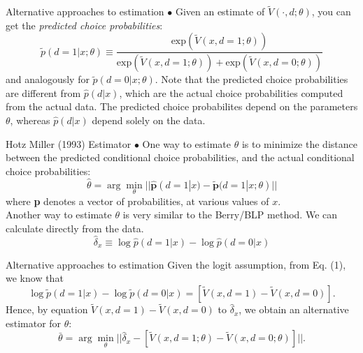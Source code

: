 \begin{frame}{Alternative approaches to estimation}
$\bullet$ Given an estimate of $\tilde V (\cdot, d; \theta)$, you can get the \emph{predicted choice probabilities}: 
\begin{equation}
\tilde p (d =1 |x ; \theta) \equiv \frac {\text{exp} \left ( \tilde V (x, d=1; \theta) \right )}{\text{exp} \left ( \tilde V (x, d=1 ;\theta) \right ) + \text{exp} \left ( \tilde V (x, d= 0 ;\theta ) \right )}
\end{equation}
and analogously for $\tilde p (d = 0 |x ; \theta)$. Note that the predicted choice probabilities are different from $\hat p (d|x)$, which are the actual choice probabilities computed from the actual data. The predicted choice probabilites depend on the parameters $\theta$, whereas $\hat p (d|x)$ depend solely on the data. 
\end{frame}

\begin{frame}{Hotz Miller (1993) Estimator}
$\bullet$ One way to estimate $\theta$ is to minimize the distance between the predicted conditional choice probabilities, and the actual conditional choice probabilities:
\begin{equation*}
\hat \theta = \arg \min_\theta || \hat {\symbf{p}} (d = 1 |x) - \tilde {\symbf{p}} (d = 1 |x; \theta) ||
\end{equation*}
where \textbf{p} denotes a vector of probabilities, at various values of $x$. \\
Another way to estimate $\theta$ is very similar to the Berry/BLP method. We can calculate directly from the data. 
\begin{equation*}
\hat \delta_x \equiv \log \hat p ( d =1 |x) - \log \hat p (d = 0 |x)
\end{equation*}
\end{frame}

\begin{frame}{Alternative approaches to estimation}
Given the logit assumption, from Eq. (1), we know that
\begin{equation*}
\log \tilde p (d=1 |x) - \log \tilde p (d =0 |x) = \left [ \tilde V (x, d =1 ) - \tilde V (x, d = 0) \right ] .
\end{equation*}
Hence, by equation $\tilde V (x, d = 1) - \tilde V (x, d =0)$ to $\hat \delta_x$, we obtain an alternative estimator for $\theta$:
\begin{equation*}
\bar \theta = \arg \min_\theta || \hat \delta_x - \left [ \tilde V (x, d =1; \theta) - \tilde V (x, d = 0 ;\theta) \right ] ||.
\end{equation*}
\end{frame}

